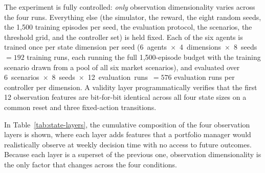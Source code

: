 \documentclass[preprint,review,authoryear,12pt]{elsarticle}
\begin{document}
The experiment is fully controlled: \emph{only} observation dimensionality varies across
the four runs. Everything else (the simulator, the reward, the eight random seeds, the
    1{,}500 training episodes per seed, the evaluation protocol, the scenarios, the threshold
grid, and the controller set) is held fixed. Each of the six agents is trained once per
state dimension per seed (6~agents~$\times$~4~dimensions~$\times$~8~seeds~$=192$ training
runs, each running the full 1{,}500-episode budget with the training scenario drawn from a
pool of all six market scenarios), and evaluated over
6~scenarios~$\times$~8~seeds~$\times$~12~evaluation~runs~$=576$ evaluation runs per
controller per dimension. A validity layer programmatically verifies that the first 12
observation features are bit-for-bit identical across all four state sizes on a common
reset and three fixed-action transitions.

In Table~\ref{tab:state-layers}, the cumulative composition of the four observation
layers is shown, where each layer adds features that a portfolio manager would
realistically observe at weekly decision time with no access to future outcomes. Because
each layer is a superset of the previous one, observation dimensionality is the only
factor that changes across the four conditions.
\end{document}
